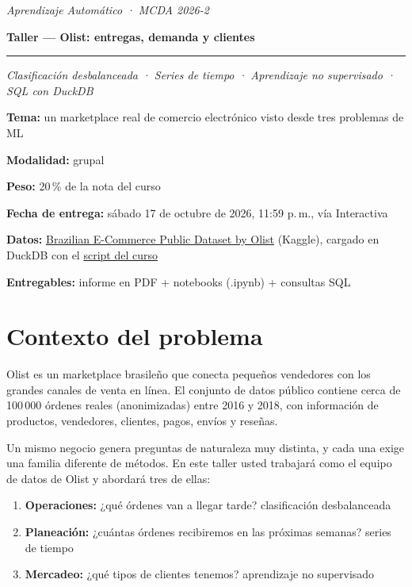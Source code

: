 \documentclass[11pt,letterpaper]{article}
\newcommand{\kaggle}{https://www.kaggle.com/datasets/olistbr/brazilian-ecommerce}
\newcommand{\buildscript}{https://github.com/anvasquezre/EAFIT_AA_2026-02/blob/main/homeworks/taller/build_olist_duckdb.py}
\begin{document}
{\itshape\color{softgray}Aprendizaje Automático · MCDA 2026-2}\par\vspace{-4pt}
{\color{eafitnavy}\fontsize{22}{27}\selectfont\bfseries Taller — Olist: entregas, demanda y clientes}\par\vspace{-2pt}
{\color{eafitaccent}\rule{\textwidth}{2pt}}\par\vspace{-2pt}
{\itshape\color{softgray}Clasificación desbalanceada · Series de tiempo · Aprendizaje no supervisado · SQL con DuckDB}\par

\begin{infobox}
  \setlength{\parskip}{5pt}
  {\color{eafitnavy}\bfseries Tema:} un marketplace real de comercio electrónico visto desde tres problemas de ML\par
  {\color{eafitnavy}\bfseries Modalidad:} grupal\par
  {\color{eafitnavy}\bfseries Peso:} 20\,\% de la nota del curso\par
  {\color{eafitnavy}\bfseries Fecha de entrega:} sábado 17 de octubre de 2026, 11:59 p.\,m., vía Interactiva\par
  {\color{eafitnavy}\bfseries Datos:} \href{\kaggle}{Brazilian E-Commerce Public Dataset by Olist} (Kaggle), cargado en DuckDB con el \href{\buildscript}{script del curso}\par
  {\color{eafitnavy}\bfseries Entregables:} informe en PDF + notebooks (.ipynb) + consultas SQL
\end{infobox}

\section{Contexto del problema}
Olist es un marketplace brasileño que conecta pequeños vendedores con los grandes canales de venta en línea. El conjunto de datos público contiene cerca de 100\,000 órdenes reales (anonimizadas) entre 2016 y 2018, con información de productos, vendedores, clientes, pagos, envíos y reseñas.

Un mismo negocio genera preguntas de naturaleza muy distinta, y cada una exige una familia diferente de métodos. En este taller usted trabajará como el equipo de datos de Olist y abordará tres de ellas:

\begin{enumerate}
  \item \textbf{Operaciones:} ¿qué órdenes van a llegar tarde? \hfill {\color{softgray}clasificación desbalanceada}
  \item \textbf{Planeación:} ¿cuántas órdenes recibiremos en las próximas semanas? \hfill {\color{softgray}series de tiempo}
  \item \textbf{Mercadeo:} ¿qué tipos de clientes tenemos? \hfill {\color{softgray}aprendizaje no supervisado}
\end{enumerate}
\end{document}

